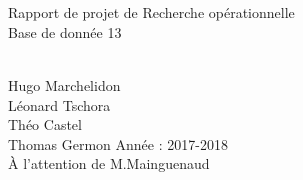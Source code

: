 \begin{titlepage}
\begin{sffamily}
\begin{center}

~\\[1cm]
\HRule
\\[0.5cm]
{\huge {\selectfont
 Rapport de projet de Recherche opérationnelle \\[0.5cm]
Base de donnée 13}}
\\[0.4cm]
\HRule
\end{center}



\\
Hugo Marchelidon \\
Léonard Tschora \\
Théo Castel \\
Thomas Germon \hfill Année : 2017-2018\\
\hfill {\`A l'attention de M.Mainguenaud}

\end{sffamily}
\end{titlepage}
